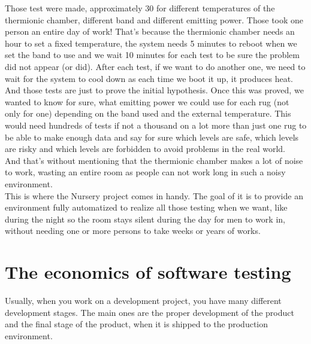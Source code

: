 \documentclass[12pt]{article}
\theoremstyle{definition}
\theoremstyle{definition}
\theoremstyle{remark}
\begin{document}
Those test were made, approximately 30 for different temperatures of the thermionic chamber, different band and different emitting power. Those took one person an entire day of work! That's because the thermionic chamber needs an hour to set a fixed temperature, the system needs 5 minutes to reboot when we set the band to use and we wait 10 minutes for each test to be sure the problem did not appear (or did). After each test, if we want to do another one, we need to wait for the system to cool down as each time we boot it up, it produces heat.\\

And those tests are just to prove the initial hypothesis. Once this was proved, we wanted to know for sure, what emitting power we could use for each \gls{rug} (not only for one) depending on the band used and the external temperature. This would need hundreds of tests if not a thousand on a lot more than just one \gls{rug} to be able to make enough data and say for sure which levels are safe, which levels are risky and which levels are forbidden to avoid problems in the real world.\\

And that's without mentioning that the thermionic chamber makes a lot of noise to work, wasting an entire room as people can not work long in such a noisy environment.\\

This is where the Nursery project comes in handy. The goal of it is to provide an environment fully automatized to realize all those testing when we want, like during the night so the room stays silent during the day for men to work in, without needing one or more persons to take weeks or years of works.



\section{The economics of software testing}


Usually, when you work on a development project, you have many different development stages. The main ones are the proper development of the product and the final stage of the product, when it is shipped to the production environment.\\
\end{document}
